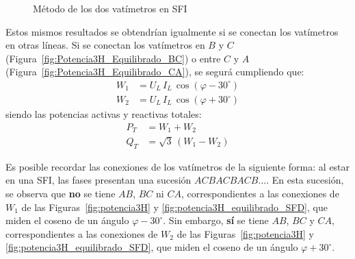 \begin{figure}[H]
    \centering
    \centering{}\hfill
    \hfill
    \caption{Método de los dos vatímetros en SFI}
    \label{fig:potencia3H_equilibrado_SFI}
\end{figure}

Estos mismos resultados se obtendrían igualmente si se conectan los vatímetros en otras líneas. Si se conectan los vatímetros en $B$ y $C$ (Figura~\ref{fig:Potencia3H_Equilibrado_BC}) o entre $C$ y $A$ (Figura~\ref{fig:Potencia3H_Equilibrado_CA}), se segurá cumpliendo que: 
\begin{align*}
    W_1&=U_L\,I_L\,\cos(\varphi-30^\circ) \\
    W_2&=U_L\,I_L\,\cos(\varphi+30^\circ)
\end{align*}
siendo las potencias activas y reactivas totales: 
\begin{align*}
    P_T&=W_1 + W_2\\
    Q_T&=\sqrt{3}\,(W_1 - W_2)
\end{align*}

\begin{remark}
    Es posible recordar las conexiones de los vatímetros de la siguiente forma: al estar en una SFI, las fases presentan una sucesión $ACBACBACB$.... En esta sucesión, se observa que {\color{red}\textbf{no}} se tiene $AB$, $BC$ ni $CA$, correspondientes a las conexiones de $W_1$ de las Figuras~\ref{fig:potencia3H} y \ref{fig:potencia3H_equilibrado_SFD}, que miden el coseno de un ángulo $\varphi-30^\circ$. Sin embargo, {\color{red}\textbf{sí}} se tiene $AB$, $BC$ y $CA$, correspondientes a las conexiones de $W_2$ de las Figuras~\ref{fig:potencia3H} y \ref{fig:potencia3H_equilibrado_SFD}, que miden el coseno de un ángulo $\varphi+30^\circ$.
\end{remark}

